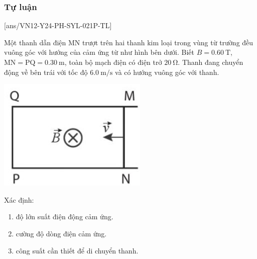 \subsubsection{Tự luận}
\setcounter{ex}{0}
[ans/VN12-Y24-PH-SYL-021P-TL]
\begin{ex}
	Một thanh dẫn điện MN trượt trên hai thanh kim loại trong vùng từ trường đều vuông góc với hướng của cảm ứng từ như hình bên dưới. Biết $B=\SI{0.60}{\tesla}$, $\mathrm{MN}=\mathrm{PQ}=\SI{0.30}{\meter}$, toàn bộ mạch điện có điện trở $\SI{20}{\ohm}$. Thanh đang chuyển động về bên trái với tốc độ $\SI{6.0}{\meter/\second}$ và có hướng vuông góc với thanh.
	\begin{center}
		\includegraphics[width=0.25\linewidth]{figs/VN12-Y24-PH-SYL-022P-8}
	\end{center}
	Xác định:
	\begin{enumerate}[label=\alph*)]
		\item độ lớn suất điện động cảm ứng.
		\item cường độ dòng điện cảm ứng.
		\item công suất cần thiết để di chuyển thanh.
	\end{enumerate}
\end{ex}
